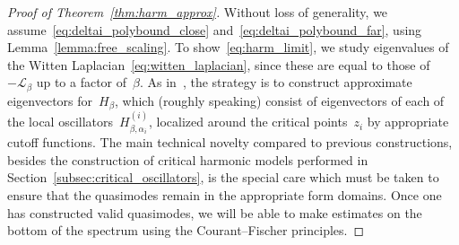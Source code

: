 \documentclass[10pt]{article}
\newcommand{\cL}{\mathcal{L}}
\newcommand{\1}{\mathbbm 1}
\begin{document}
    \begin{proof}[Proof of Theorem~\ref{thm:harm_approx}]
        Without loss of generality, we assume~\eqref{eq:deltai_polybound_close} and~\eqref{eq:deltai_polybound_far}, using Lemma~\ref{lemma:free_scaling}.
        To show~\eqref{eq:harm_limit}, we study eigenvalues of the Witten Laplacian~\eqref{eq:witten_laplacian}, since these are equal to those of~$-\cL_\beta$ up to a factor of~$\beta$.
        As in~\cite{S83}, the strategy is to construct approximate eigenvectors for~$H_\beta$, which (roughly speaking) consist of eigenvectors of each of the local oscillators~$H_{\beta,\alpha_i}^{(i)}$, localized around the critical points~$z_i$ by appropriate cutoff functions.
        The main technical novelty compared to previous constructions, besides the construction of critical harmonic models performed in Section~\ref{subsec:critical_oscillators}, is the special care which must be taken to ensure that the quasimodes remain in the appropriate form domains. Once one has constructed valid quasimodes, we will be able to make estimates on the bottom of the spectrum using the Courant--Fischer principles.


\end{proof}
\end{document}
